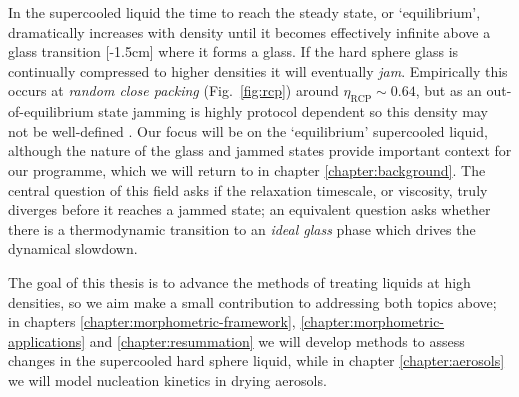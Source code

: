 \documentclass[11pt,twoside]{report}
\begin{document}
In the supercooled liquid the time to reach the steady state, or `equilibrium', dramatically increases with density until it becomes effectively infinite above a glass transition%
[-1.5cm]
where it forms a glass.
If the hard sphere glass is continually compressed to higher densities it will eventually \emph{jam}.
Empirically this occurs at \emph{random close packing} (Fig.\ \ref{fig:rcp}) around $\eta_\mathrm{RCP} \sim 0.64$, but as an out-of-equilibrium state jamming is highly protocol dependent so this density may not be well-defined \cite{TorquatoRMP2010}.
Our focus will be on the `equilibrium' supercooled liquid, although the nature of the glass and jammed states provide important context for our programme, which we will return to in chapter \ref{chapter:background}.
The central question of this field asks if the relaxation timescale, or viscosity, truly diverges before it reaches a jammed state; an equivalent question asks whether there is a thermodynamic transition to an \emph{ideal glass} phase which drives the dynamical slowdown.

The goal of this thesis is to advance the methods of treating liquids at high densities, so we aim make a small contribution to addressing both topics above; in chapters \ref{chapter:morphometric-framework}, \ref{chapter:morphometric-applications} and \ref{chapter:resummation} we will develop methods to assess changes in the supercooled hard sphere liquid, while in chapter \ref{chapter:aerosols} we will model nucleation kinetics in drying aerosols.

\end{document}
